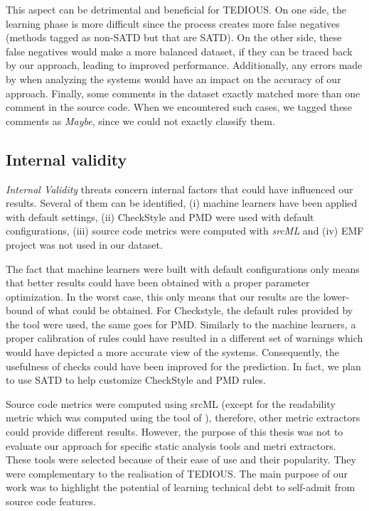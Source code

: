 This aspect can be detrimental and beneficial for TEDIOUS. On one side, the learning phase is more difficult since the process creates more false negatives (methods tagged as non-SATD but that are SATD). On the other side, these false negatives would make a more balanced dataset, if they can be traced back by our approach, leading to improved performance. Additionally, any errors made by \citet{maldonado17} when analyzing the systems would have an impact on the accuracy of our approach. Finally, some comments in the dataset exactly matched more than one comment in the source code. When we encountered such cases, we tagged these comments as \textit{Maybe}, since we could not exactly classify them.

\subsection{Internal validity}


\textit{Internal Validity} threats concern internal factors that could have influenced our results. Several of them can be identified, (i) machine learners have been applied with default settings, (ii) CheckStyle and PMD were used with default configurations, (iii) source code metrics were computed with \textit{srcML} and (iv) \textsc{EMF} project was not used in our dataset.

The fact that machine learners were built with default configurations only means that better results could have been obtained with a proper parameter optimization. In the worst case, this only means that our results are the lower-bound of what could be obtained. For Checkstyle, the default rules provided by the tool were used, the same goes for PMD. Similarly to the machine learners, a proper calibration of rules could have resulted in a different set of warnings which would have depicted a more accurate view of the systems. Consequently, the usefulness of checks could have been improved for the prediction. In fact, we plan to use SATD to help customize CheckStyle and PMD rules.

Source code metrics were computed using srcML \citep{Collard2013} (except for the readability metric which was computed using the tool of \citet{buse2008metric}), therefore, other metric extractors could provide different results. However, the purpose of this thesis was not to evaluate our approach for specific static analysis tools and metri extractors. These tools were selected because of their ease of use and their popularity. They were complementary to the realisation of TEDIOUS. The main purpose of our work was to highlight the potential of learning technical debt to self-admit from source code features.

